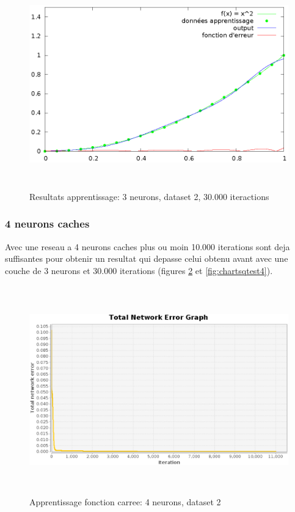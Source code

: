 \documentclass[twoside,openright,a4paper,11pt,french]{article}
\begin{document}
\begin{figure}[h]
\centering
\includegraphics[width=12cm,height=9cm]{./pics/chartsqtest3.eps}
\caption{Resultats apprentissage: 3 neurons, dataset 2, 30.000 iteractions}
\label{fig:chartsqtest3}
\end{figure}


\subsubsection{4 neurons caches}

Avec une reseau a 4 neurons caches plus ou moin 10.000 iterations
sont deja suffisantes pour obtenir un resultat qui depasse celui obtenu
avant avec une couche de 3 neurons et 30.000 iterations 
(figures \ref{fig:sqtest4} et \ref{fig:chartsqtest4}).


\begin{figure}[h]
\centering
\includegraphics[width=12cm,height=9cm]{./pics/sqtest4.eps}
\caption{Apprentissage fonction carree: 4 neurons, dataset 2}
\label{fig:sqtest4}
\end{figure}
\end{document}
